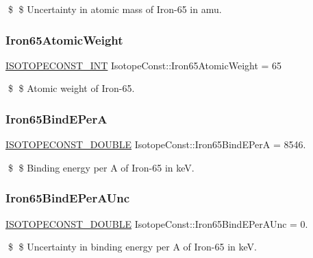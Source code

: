 \$ \$ Uncertainty in atomic mass of Iron-\/65 in amu. \mbox{\label{group___isotope_const-_iron-_fe65_ga71cb1d3710efea501df3c9d4f7e74904}} 
\subsubsection{\texorpdfstring{Iron65\+Atomic\+Weight}{Iron65AtomicWeight}}
{\footnotesize\ttfamily \mbox{\hyperlink{group___isotope_const-_macros_ga5f18360b3e99483a35c32d789e62621c}{I\+S\+O\+T\+O\+P\+E\+C\+O\+N\+S\+T\+\_\+\+I\+NT}} Isotope\+Const\+::\+Iron65\+Atomic\+Weight = 65}

\$ \$ Atomic weight of Iron-\/65. \mbox{\label{group___isotope_const-_iron-_fe65_gad428eb93fc4ed409511fb5c90654aed7}} 
\subsubsection{\texorpdfstring{Iron65\+Bind\+E\+PerA}{Iron65BindEPerA}}
{\footnotesize\ttfamily \mbox{\hyperlink{group___isotope_const-_macros_ga8f45a7272ce02c0b4c65c44636ed719a}{I\+S\+O\+T\+O\+P\+E\+C\+O\+N\+S\+T\+\_\+\+D\+O\+U\+B\+LE}} Isotope\+Const\+::\+Iron65\+Bind\+E\+PerA = 8546.}

\$ \$ Binding energy per A of Iron-\/65 in keV. \mbox{\label{group___isotope_const-_iron-_fe65_gacec111259ba0e09052fcef4032423140}} 
\subsubsection{\texorpdfstring{Iron65\+Bind\+E\+Per\+A\+Unc}{Iron65BindEPerAUnc}}
{\footnotesize\ttfamily \mbox{\hyperlink{group___isotope_const-_macros_ga8f45a7272ce02c0b4c65c44636ed719a}{I\+S\+O\+T\+O\+P\+E\+C\+O\+N\+S\+T\+\_\+\+D\+O\+U\+B\+LE}} Isotope\+Const\+::\+Iron65\+Bind\+E\+Per\+A\+Unc = 0.}

\$ \$ Uncertainty in binding energy per A of Iron-\/65 in keV. \mbox{\label{group___isotope_const-_iron-_fe65_gab7ade03552945b255319aa2c18aac531}} 

